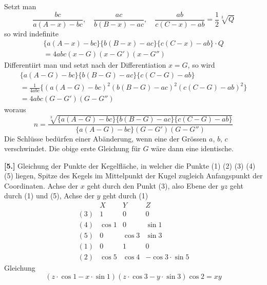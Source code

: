 \documentclass[10pt,a4paper]{article}
\begin{document}
Setzt man
%
\begin{equation*}
\frac{bc}{a(A - x) - bc}, \quad
\frac{ac}{b(B - x) - ac}, \quad
\frac{ab}{c(C - x) - ab} = \frac{1}{2}\sqrt[3]{Q}
\end{equation*}
%
so wird indefinite
%
\begin{multline*}
\{a(A - x) - bc\}\{b(B - x) - ac\}\{c(C - x) - ab\}\cdot Q \\
= 4abc(x - G)(x - G')(x - G'')
\end{multline*}
%
Differentiirt man und setzt nach der Differentiation $x = G$, so wird
%
\begin{multline*}
\{a(A - G) - bc\}\{b(B - G) - ac\}\{c(C - G) - ab\} \\
= \tfrac{1}{4abc}\{(a(A - G) - bc)^2(b(B - G) - ac)^2(c(C - G) - ab)^2\} \\
= 4abc(G - G')(G - G'')
\end{multline*}
%
woraus
%
\begin{equation*}
n = \frac{\sqrt[3]{\{a(A - G) - bc\}\{b(B - G) - ac\}\{c(C - G) - ab\}}}{\{a(A - G) - bc\}(G - G')(G - G'')}
\end{equation*}
%
Die Schl\"usse bed\"urfen einer Ab\"anderung, wenn eine der Gr\"ossen $a$, $b$, $c$ verschwindet. Die obige erste Gleichung f\"ur $G$ w\"are dann eine identische.

\textbf{[5.]} Gleichung der Punkte der Kegelfl\"ache, in welcher die Punkte (1) (2) (3) (4) (5) liegen, Spitze des Kegels im Mittelpunkt der Kugel zugleich Anfangspunkt der Coordinaten. Achse der $x$ geht durch den Punkt (3), also Ebene der $yz$ geht durch (1) und (5), Achse der $y$ geht durch (1)
%
\begin{equation*}
\begin{array}{c|ccc}
& X & Y & Z \\ \hline
(3) & 1 & 0 & 0 \\
(4) & \cos 1 & 0 & \sin 1 \\
(5) & 0 & \cos 3 & \sin 3 \\
(1) & 0 & 1 & 0 \\
(2) & \cos 5 & \cos 4 & -\cos 3 \cdot \sin 5
\end{array}
\end{equation*}
%
Gleichung
%
\begin{equation*}
(z \cdot \cos 1 - x \cdot \sin 1)(z \cdot \cos 3 - y \cdot \sin 3) \cos 2 = xy
\end{equation*}
\end{document}
